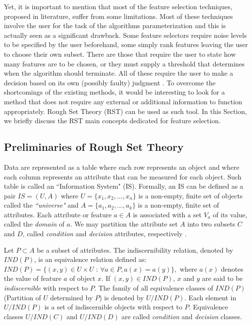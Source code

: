 \documentclass{llncs}
\begin{document}
Yet, it is important to mention that most of the feature selection techniques, proposed in literature, suffer from some limitations. Most of these techniques involve the user for the task of the algorithms parameterization and this is actually seen as a significant drawback. Some feature selectors require noise levels to be specified by the user beforehand, some simply rank features leaving the user to choose their own subset. There are those that require the user to state how many features are to be chosen, or they must supply a threshold that determines when the algorithm should terminate. All of these require the user to make a decision based on its own (possibly faulty) judgment \cite{jensen2005semantics}. To overcome the shortcomings of the existing methods, it would be interesting to look for a method that does not require any external or additional information to function appropriately. Rough Set Theory (RST) \cite{pawlak2008rough} can be used as such tool. In this Section, we briefly discuss the RST main concepts dedicated for feature selection.

\subsection{Preliminaries of Rough Set Theory}
Data are represented as a table where each row represents an object and where each column represents an attribute
that can be measured for each object. Such table is called an ``Information System" (IS). Formally, an IS can be defined as a pair $IS = (U, A)$ where $U = \{x_1, x_2, \ldots, x_n\}$  is a non-empty, finite set of objects called the \emph{``universe"} and $A = \{a_1, a_2, \ldots, a_k\}$ is a non-empty, finite set of attributes. Each attribute or feature $a \in A $ is associated with a set $V_a$ of its value, called the \emph{domain} of $a$. We may partition the attribute set $A$ into two subsets $C$ and $D$, called   \emph{condition} and \emph{decision} attributes, respectively \cite{pawlak2008rough}.


Let $P \subset A$ be a subset of attributes. The indiscernibility relation, denoted by $IND(P)$, is an equivalence relation defined as: $IND(P) =  \{(x, y) \in U \times U \mbox{ : } \forall a \in P, a(x) = a(y)\},$ where $a(x)$ denotes the value of feature $a$ of object $x$. If $(x, y) \in IND(P)$, $x$ and $y$ are said to be \emph{indiscernible} with respect to $P$. The family of all equivalence classes of $IND(P)$ (Partition of $U$ determined by $P$) is denoted by $U/IND(P)$. Each element
in $U/IND(P)$ is a set of indiscernible objects with respect to $P$. Equivalence classes $U/IND(C)$ and $U/IND(D)$
are called \emph{condition} and \emph{decision} classes.
\end{document}
